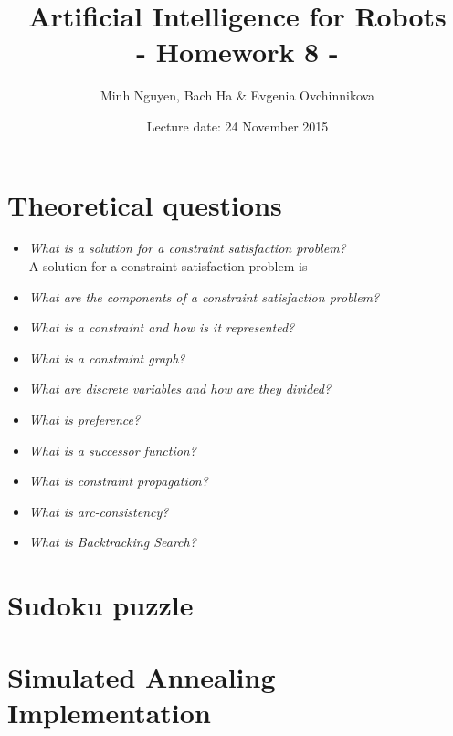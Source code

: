 \documentclass[a4paper, 12pt]{article}
\title{Artificial Intelligence for Robots \\
				- Homework 8 -}
\author{Minh Nguyen, Bach Ha \& Evgenia Ovchinnikova}
\date{Lecture date: 24 November 2015}
\begin{document}
\maketitle

\section{Theoretical questions}

    \begin{itemize}
        \item \emph{What is a solution for a constraint satisfaction problem?}\\
            A solution for a constraint satisfaction problem is
        \item \emph{What are the components of a constraint satisfaction problem?}
        \item \emph{What is a constraint and how is it represented?}
        \item \emph{What is a constraint graph?}
        \item \emph{What are discrete variables and how are they divided?}
        \item \emph{What is preference?}
        \item \emph{What is a successor function?}
        \item \emph{What is constraint propagation?}
        \item \emph{What is arc-consistency?}
        \item \emph{What is Backtracking Search?}
    \end{itemize}

\section{Sudoku puzzle}


\section{Simulated Annealing Implementation}
\end{document}
